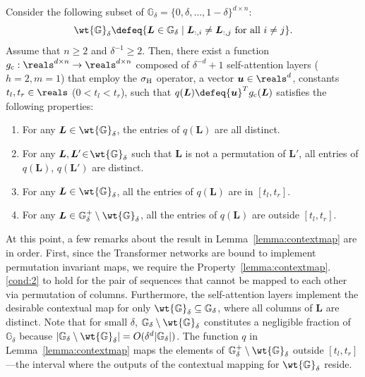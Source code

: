 \documentclass{article} %
\def\vu{{\bm{u}}}
\def\mL{{\bm{L}}}
\def\sG{{\mathbb{G}}}
\newcommand{\hdmx}{\sigma_{\rm H}}
\begin{document}
\begin{lemma}
\label{lemma:contextmap}
Consider the following subset of $\sG_{\delta} = \{0, \delta, \dots, 1-\delta\}^{d \times n}$:
\begin{equation*}
\wt {\sG}_{\delta}
\defeq 
\{ \mL \in \sG_{\delta} \mid \text{$\mL_{:,i} \neq \mL_{:,j}$ for all $i \neq j$} \}.
\end{equation*}
Assume that $n \geq 2$ and $\delta^{-1} \geq 2$.
Then, there exist a function $g_{\rm c}: \reals^{d \times n} \to \reals^{d \times n}$ composed of $\delta^{-d} + 1$ self-attention layers \textup{($h = 2, m = 1$)} that employ the $\hdmx$ operator, a vector $\vu \in \reals^d$, constants $t_l, t_r \in \reals$ \textup{($0 < t_l < t_r$)}, such that $q(\mL) \defeq \vu^T g_{\rm c}(\mL)$ satisfies the following properties:
\begin{enumerate}[\hspace{5pt}1.]
\setlength{\itemsep}{-3pt}
    \item \label{cond:1} For any $\mL \in \wt {\sG}_{\delta}$, the entries of $q(\mL)$ are all distinct.
    \item \label{cond:2} For any $\mL, \mL' \!\in\! \wt {\sG}_{\delta}$ such that $\mL$ is not a permutation of $\mL'$, all entries of $q(\mL)$, $q(\mL')$ are distinct.
    \item \label{cond:3} For any $\mL \in \wt {\sG}_{\delta}$, all the entries of $q(\mL)$ are in $[t_l, t_r]$.
    \item \label{cond:4} For any $\mL \in \sG^+_{\delta} \setminus \wt {\sG}_{\delta}$, all the entries of $q(\mL)$ are outside $[t_l, t_r]$.
\end{enumerate}
\end{lemma}
At this point, a few remarks about the result in Lemma~\ref{lemma:contextmap} are in order. First, since the Transformer networks are bound to implement permutation invariant maps, we require the Property~\ref{lemma:contextmap}.\ref{cond:2} to hold for the pair of sequences that cannot be mapped to each other via permutation of columns. Furthermore, the self-attention layers implement the desirable contextual map for only $\wt{\sG}_{\delta} \subseteq \sG_{\delta}$, where all columns of $\mL$ are distinct. Note that for small $\delta$, $\sG_{\delta} \setminus \wt {\sG}_{\delta}$ constitutes a negligible fraction of $\sG_{\delta}$ because  $|\sG_{\delta} \setminus \wt {\sG}_{\delta}| = O(\delta^d |\sG_{\delta}|)$. The function $q$ in Lemma~\ref{lemma:contextmap} maps the elements of $\sG^+_{\delta} \setminus \wt {\sG}_{\delta}$ outside $[t_l, t_r]$---the interval where the outputs of the contextual mapping for $\wt \sG_{\delta}$ reside.
\end{document}
